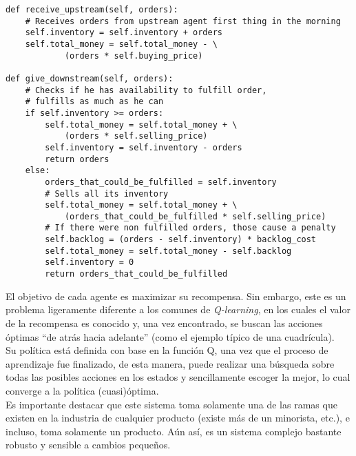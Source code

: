 \begin{listing}[ht]
\begin{verbatim}
def receive_upstream(self, orders):
    # Receives orders from upstream agent first thing in the morning
    self.inventory = self.inventory + orders
    self.total_money = self.total_money - \
            (orders * self.buying_price)
                
def give_downstream(self, orders):
    # Checks if he has availability to fulfill order,
    # fulfills as much as he can
    if self.inventory >= orders:
        self.total_money = self.total_money + \
            (orders * self.selling_price)
        self.inventory = self.inventory - orders
        return orders
    else:
        orders_that_could_be_fulfilled = self.inventory
        # Sells all its inventory
        self.total_money = self.total_money + \
            (orders_that_could_be_fulfilled * self.selling_price)
        # If there were non fulfilled orders, those cause a penalty
        self.backlog = (orders - self.inventory) * backlog_cost
        self.total_money = self.total_money - self.backlog
        self.inventory = 0
        return orders_that_could_be_fulfilled
\end{verbatim}
\end{listing}


El objetivo de cada agente es maximizar su recompensa. Sin embargo, este es un problema ligeramente diferente a los comunes de \textit{Q-learning}, en los cuales el valor de la recompensa es conocido y, una vez encontrado, se buscan las acciones \'optimas ``de atr\'as hacia adelante'' (como el ejemplo t\'ipico de una cuadr\'icula).\\


Su pol\'itica est\'a definida con base en la funci\'on Q, una vez que el proceso de aprendizaje fue finalizado, de esta manera, puede realizar una b\'usqueda sobre todas las posibles acciones en los estados y sencillamente escoger la mejor, lo cual converge a la pol\'itica (cuasi)\'optima. \\

Es importante destacar que este sistema toma solamente una de las ramas que existen en la industria de cualquier producto (existe m\'as de un minorista, etc.), e incluso, toma solamente un producto. A\'un as\'i, es un sistema complejo bastante robusto y sensible a cambios peque\~nos.